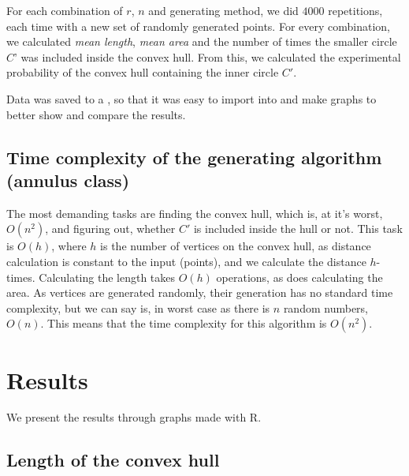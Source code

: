 \documentclass[12pt,a4paper]{article}
\begin{document}
For each combination of $r$, $n$ and generating method, we did $4000$ repetitions, each time with a new set of randomly generated points. For every combination, we calculated \textit{mean length}, \textit{mean area} and the number of times the smaller circle $C’$ was included inside the convex hull. From this, we calculated the experimental probability of the convex hull containing the inner circle $C'$. \medskip
 
Data was saved to a , so that it was easy to import into  and make graphs to better show and compare the results.

\subsection{Time complexity of the generating algorithm (annulus class)}
The most demanding tasks are finding the convex hull, which is, at it's worst, $O(n^2)$, and figuring out, whether $C'$ is included inside the hull or not. This task is $O(h)$, where $h$ is the number of vertices on the convex hull, as distance calculation is constant to the input (points), and we calculate the distance $h$-times. Calculating the length takes $O(h)$ operations, as does calculating the area. As vertices are generated randomly, their generation has no standard time complexity, but we can say is, in worst case as there is $n$ random numbers, $O(n)$. This means that the time complexity for this algorithm is $O(n^2)$.

\section{Results}

We present the results through graphs made with R. 
\subsection{Length of the convex hull}
\end{document}
